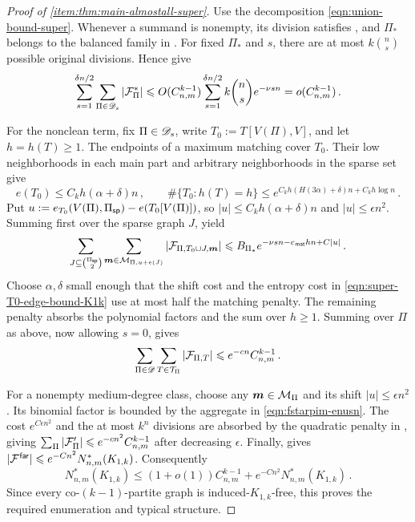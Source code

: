 \begin{proof}[Proof of  \ref{item:thm:main-almostall-super}]
Use the decomposition \eqref{eqn:union-bound-super}. Whenever a summand is nonempty, its division satisfies , and $\Pi_\ast$ belongs to the balanced family in . For fixed $\Pi_\ast$ and $s$, there are at most $k\binom ns$ possible original divisions. Hence  give
$$\sum_{s=1}^{\delta n/2}\sum_{\Pi\in{\mathscr D}_s}|{\mathcal F}^\ast_\Pi|\leqslant O(C^{k-1}_{n,m})\sum_{s=1}^{\delta n/2}k\binom ns e^{-\nu sn}=o(C^{k-1}_{n,m})\,.$$

For the nonclean term, fix $\Pi\in{\mathscr D}_s$, write $T_0:=T[V(\Pi),V]$, and let $h=h(T)\geq1$. The endpoints of a maximum matching cover $T_0$. Their low neighborhoods in each main part and arbitrary neighborhoods in the sparse set give
\begin{equation}\label{eqn:super-T0-edge-bound-K1k}
e(T_0)\leq C_kh(\alpha+\delta)n\,,\qquad \#\{T_0:h(T)=h\}\leq e^{C_kh(H(3\alpha)+\delta)n+C_kh\log n}\,.
\end{equation}
Put $u:=e_{T_0}(V(\Pi),\Pi_{\mathsf{sp}})-e(T_0[V(\Pi)])$, so $|u|\leq C_kh(\alpha+\delta)n$ and $|u|\leq\epsilon n^2$. Summing first over the sparse graph $J$,  yield
\begin{equation}\label{eqn:super-FPiT-summed-K1k}
\sum_{J\subseteq\binom{\Pi_{\mathsf{sp}}}{2}}\sum_{\boldsymbol{m}\in{\mathcal M}_{\Pi,u+e(J)}}|{\mathcal F}_{\Pi,T_0\cup J,\boldsymbol{m}}|\leqslant B_{\Pi_\ast}e^{-\nu sn-c_{\hspace{0.2mm}\mathsf{mat}} hn+C|u|}\,.
\end{equation}
Choose $\alpha,\delta$ small enough that the shift cost and the entropy cost in \eqref{eqn:super-T0-edge-bound-K1k} use at most half the matching penalty. The remaining penalty absorbs the polynomial factors and the sum over $h\geq1$. Summing over $\Pi$ as above, now allowing $s=0$, gives
$$\sum_{\Pi\in{\mathscr D}}\sum_{T\in{\mathcal T}_\Pi}|{\mathcal F}_{\Pi,T}|\leqslant e^{-cn}C^{k-1}_{n,m}\,.$$

For a nonempty medium-degree class, choose any $\boldsymbol{m}\in{\mathcal M}_\Pi$ and its shift $|u|\leq\epsilon n^2$. Its binomial factor is bounded by the aggregate in \eqref{eqn:fstarpim-enusn}. The cost $e^{C\epsilon n^2}$ and the at most $k^n$ divisions are absorbed by the quadratic penalty in , giving $\sum_\Pi|{\mathcal F}'_\Pi|\leqslant e^{-cn^2}C^{k-1}_{n,m}$ after decreasing $\epsilon$. Finally,  gives $|{\mathcal F}^{\hspace{0.2mm}\mathsf{far}}|\leqslant e^{-Cn^2}N^\ast_{n,m}(K_{1,k})$. Consequently
$$N^\ast_{n,m}(K_{1,k})\leq(1+o(1))C^{k-1}_{n,m}+e^{-Cn^2}N^\ast_{n,m}(K_{1,k})\,.$$
Since every co-$(k-1)$-partite graph is induced-$K_{1,k}$-free, this proves the required enumeration and typical structure.
\end{proof}
